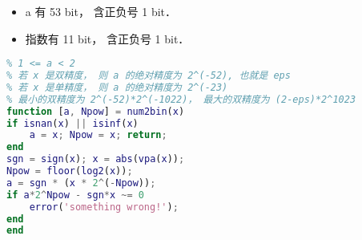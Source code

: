 
\begin{itemize}
\item a 有 53 bit， 含正负号 1 bit．
\item 指数有 11 bit， 含正负号 1 bit．
\end{itemize}

\begin{lstlisting}[language=matlab, caption=num2bin.m]
% x = a*2^Npw (exactly)
% 1 <= a < 2
% 若 x 是双精度， 则 a 的绝对精度为 2^(-52), 也就是 eps
% 若 x 是单精度， 则 a 的绝对精度为 2^(-23)
% 最小的双精度为 2^(-52)*2^(-1022)， 最大的双精度为 (2-eps)*2^1023
function [a, Npow] = num2bin(x)
if isnan(x) || isinf(x)
    a = x; Npow = x; return;
end
sgn = sign(x); x = abs(vpa(x));
Npow = floor(log2(x));
a = sgn * (x * 2^(-Npow));
if a*2^Npow - sgn*x ~= 0
    error('something wrong!');
end
end
\end{lstlisting}
